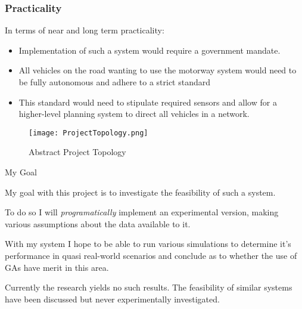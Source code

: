 \documentclass{beamer} \usepackage{pgfpages} \setbeamertemplate{bibliography item}{\insertbiblabel}
\begin{document}
\begin{frame}{}
    \frametitle{Practicality}
    In terms of near and long term practicality:
    \begin{itemize}
        \item Implementation of such a system would require a government mandate.
        \item All vehicles on the road wanting to use the motorway system would need to be fully autonomous and adhere to a strict standard
        \item This standard would need to stipulate required sensors and allow for a higher-level planning system to direct all vehicles in a network.
    \end{itemize}
\end{frame}

\begin{frame}

    \begin{figure}[htpb]
        \centering
        \texttt{[image: ProjectTopology.png]}
        \caption{Abstract Project Topology}%
        \label{fig:ProjectTopology}
    \end{figure}
\end{frame}
\begin{frame}{My Goal}


    My goal with this project is to investigate the feasibility of such a system. 

    To do so I will \textit{programatically} implement an experimental version, making various assumptions about the data available to it.

    With my system I hope to be able to run various simulations to determine it's performance in quasi real-world scenarios and conclude as to whether the use of GAs have merit in this area. 

    Currently the research yields no such results. The feasibility of similar systems have been discussed\cite{kalaOnroadIntelligentVehicles2016} but never experimentally investigated.
    
\end{frame}
\end{document}
